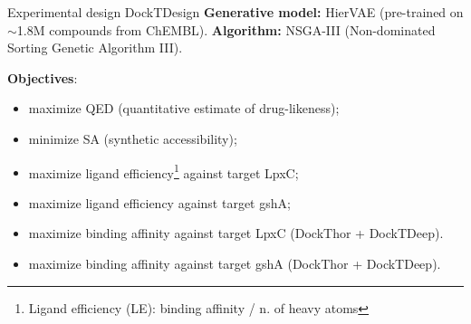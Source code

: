 \documentclass[aspectratio=169,xcolor=dvipsnames]{beamer}
\begin{document}
\begin{frame}{Experimental design \hfill {\footnotesize \alert{DockTDesign}}}
    \textbf{Generative model:} HierVAE (pre-trained on $\sim$1.8M compounds from ChEMBL).
    \textbf{Algorithm:} NSGA-III (Non-dominated Sorting Genetic Algorithm III).

    \vspace{0.5em}

    \textbf{Objectives}:
    \begin{itemize}
        \item[1.] maximize QED (quantitative estimate of drug-likeness);
        \item[2.] minimize SA (synthetic accessibility);
        \item[3.] maximize ligand efficiency\footnote{Ligand efficiency (LE): binding affinity / n. of heavy atoms} against target LpxC;
        \item[4.] maximize ligand efficiency against target gshA;
        \item[5.] maximize binding affinity against target LpxC (\alert{DockThor} + \alert{DockTDeep}).
        \item[6.] maximize binding affinity against target gshA (\alert{DockThor} + \alert{DockTDeep}).
    \end{itemize}
\end{frame}


\end{document}
